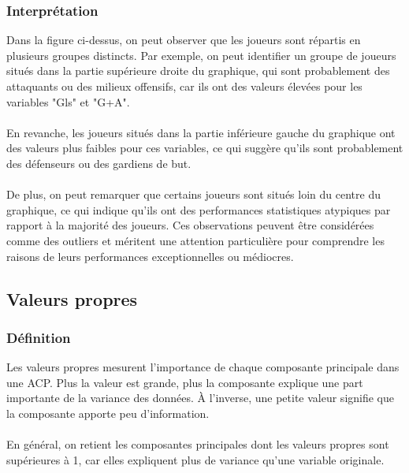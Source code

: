 \documentclass[11pt]{scrartcl}
\begin{document}
            \subsubsection{Interprétation}
                Dans la figure ci-dessus, on peut observer que les joueurs sont répartis en plusieurs groupes distincts. Par exemple, on peut identifier un groupe de joueurs situés dans la partie supérieure droite du graphique, qui sont probablement des attaquants ou des milieux offensifs, car ils ont des valeurs élevées pour les variables "Gls" et "G+A".\\\\
                En revanche, les joueurs situés dans la partie inférieure gauche du graphique ont des valeurs plus faibles pour ces variables, ce qui suggère qu'ils sont probablement des défenseurs ou des gardiens de but.\\\\
                De plus, on peut remarquer que certains joueurs sont situés loin du centre du graphique, ce qui indique qu'ils ont des performances statistiques atypiques par rapport à la majorité des joueurs. Ces observations peuvent être considérées comme des outliers et méritent une attention particulière pour comprendre les raisons de leurs performances exceptionnelles ou médiocres.\\



        \subsection{Valeurs propres}
            \subsubsection{Définition}

                Les valeurs propres mesurent l’importance de chaque composante principale dans une ACP. Plus la valeur est grande, plus la composante explique une part importante de la variance des données. À l’inverse, une petite valeur signifie que la composante apporte peu d’information.\\\\
                En général, on retient les composantes principales dont les valeurs propres sont supérieures à 1, car elles expliquent plus de variance qu’une variable originale.
\end{document}

